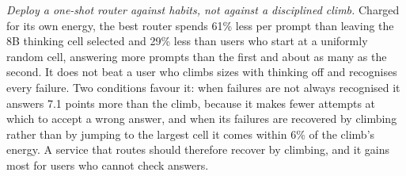 \emph{Deploy a one-shot router against habits, not against a disciplined
climb.} Charged for its own energy, the best router spends 61\% less per
prompt than leaving the 8B thinking cell selected and 29\% less than users
who start at a uniformly random cell, answering more prompts than the first
and about as many as the second. It does not beat a user who climbs sizes
with thinking off and recognises every failure. Two conditions favour it:
when failures are not always recognised it answers 7.1 points more than the
climb, because it makes fewer attempts at which to accept a wrong answer,
and when its failures are recovered by climbing rather than by jumping to
the largest cell it comes within 6\% of the climb's energy. A service that
routes should therefore recover by climbing, and it gains most for users who
cannot check answers.
